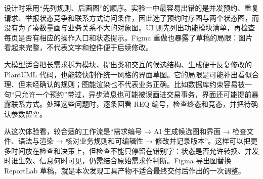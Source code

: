 \documentclass[
  chinese,
  10pt,
  a4paper,
]{article}
\begin{document}
设计时采用``先列规则、后画图''的顺序。实验一中最容易出错的是并发预约、重复请求、举报状态竞争和联系方式访问条件，因此选了预约时序图与两个状态图，而没有为了凑数量画与业务关系不大的对象图。UI
则先列出功能模块清单，再检查每页是否有相应的操作入口和状态提示。Figma
重做也暴露了草稿的局限：图片看起来完整，不代表文字和控件便于后续修改。

大模型适合把长需求拆为模块、提出类和交互的候选结构、生成便于反复修改的
PlantUML
代码，也能较快制作统一风格的界面草图。它的局限是可能补出看似合理、但未经确认的规则；图能渲染也不代表业务正确。比如数据库约束容易被一句``只允许一个预约''带过，异步消息也可能被误画进交易事务，界面还可能提前暴露联系方式。处理这些问题时，逐条回看
REQ 编号，检查终态和竞态，并把待确认参数留空。

从这次体验看，较合适的工作流是``需求编号 → AI 生成候选图和界面 →
检查文件、语法与渲染 → 核对业务规则和可编辑性 →
修改并记录版本''。这样可以把更多时间放在检查和决策上，但检查不能只停留在错别字：状态是否允许转换、并发时谁生效、信息何时可见，仍需结合原始需求作判断。Figma
导出图替换 ReportLab
草稿，就是本次发现工具产物不适合最终交付后作出的一次调整。
\end{document}
